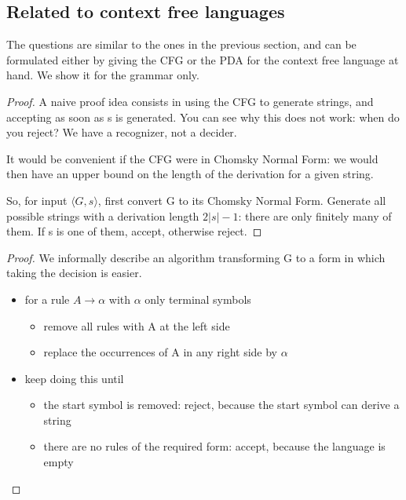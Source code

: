 \subsection{Related to context free languages}

The questions are similar to the ones in the previous section, and can
be formulated either by giving the CFG or the PDA for the context free
language at hand. We show it for the grammar only.


\begin{proof}
A naive proof idea consists in using the CFG to generate strings, and
accepting as soon as s is generated. You can see why this does not work:
when do you reject? We have a recognizer, not a decider. 

It would be convenient if the CFG were in Chomsky Normal Form: we
would then have an upper bound on the length of the derivation for a
given string.

So, for input $\langle G,s \rangle$, first convert G to its Chomsky
Normal Form. Generate all possible strings with a derivation length
$2|s|-1$: there are only finitely many of them. If s is one of them,
accept, otherwise reject.
\end{proof}

\begin{proof}
We informally describe an algorithm transforming G to a form in which
taking the decision is easier.
\begin{itemize}
\item
for a rule $A \rightarrow \alpha$ with $\alpha$ only terminal symbols
\begin{itemize}
\item remove all rules with A at the left side
\item replace the occurrences of A in any right side by $\alpha$
\end{itemize}


\item
keep doing this until 
\begin{itemize}
\item the start symbol is removed: reject, because the start symbol
  can derive a string
\item there are no rules of the required form: accept, because the
  language is empty
\end{itemize}
\end{itemize}
\end{proof}

